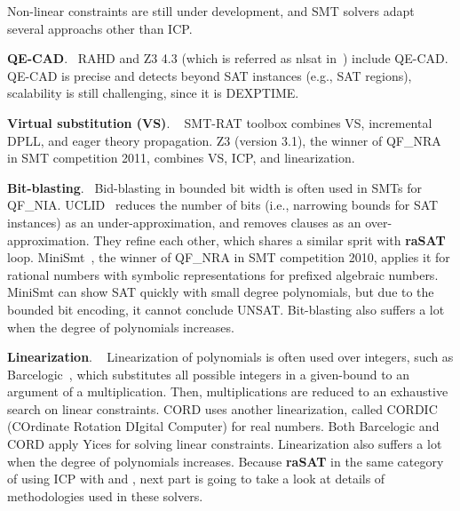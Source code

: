 \documentclass[runningheads,a4paper,oribibl]{llncs}
\newcommand{\mizuhito}[1]{\{{\bf Mizuhito:~\sf #1}\}} %
\begin{document}
Non-linear constraints are still under development, and SMT solvers adapt 
several approachs other than ICP. 

\medskip \noindent
\textbf{QE-CAD}. ~RAHD \cite{Passmore09combineddecision} and 
Z3 4.3 (which is referred as nlsat in~\cite{Jovanovic13}) include QE-CAD. 
QE-CAD is precise and detects beyond SAT instances (e.g., SAT regions), 
scalability is still challenging, since it is DEXPTIME. 

\medskip \noindent
\textbf{Virtual substitution (VS)}. ~
SMT-RAT toolbox \cite{smtrat}\cite{vssmt} combines 
VS, incremental DPLL, and %
eager theory propagation. 
Z3 (version 3.1), the winner of QF\_NRA in SMT competition 2011, 
combines VS, ICP, and linearization.

\medskip \noindent
\textbf{Bit-blasting}. ~Bid-blasting in bounded bit width is often used in SMTs for QF\_NIA. 
UCLID~\cite{Bryant07decidingbit-vector} reduces the number of bits (i.e., narrowing bounds for SAT instances) 
as an under-approximation, and removes clauses as an over-approximation. 
They refine each other, which shares a similar sprit with {\bf raSAT} loop. 
MiniSmt~\cite{Zankl:2010:SNR:1939141.1939168}, the winner of QF\_NRA in SMT competition 2010, 
applies it for rational numbers with symbolic representations for prefixed algebraic numbers. 
MiniSmt can show SAT quickly with small degree polynomials, but due to the bounded bit encoding, 
it cannot conclude UNSAT.
Bit-blasting also suffers a lot when the degree of polynomials increases. 

\medskip \noindent
\textbf{Linearization}. ~
Linearization of polynomials is often used over integers, such as Barcelogic~\cite{Borralleras:2009:SNP:1614530.1614561}, 
which substitutes all possible integers in a given-bound to an argument of a multiplication. 
Then, multiplications are reduced to an exhaustive search on linear constraints. 
CORD \cite{cordic} uses another linearization, called 
CORDIC (COrdinate Rotation DIgital Computer) for real numbers. 
Both Barcelogic and CORD apply Yices for solving linear constraints.
Linearization also suffers a lot when the degree of polynomials increases. 
Because \textbf{raSAT} in the same category of using ICP with  and , next part is going to take a look at details of methodologies used in these solvers.
\end{document}
